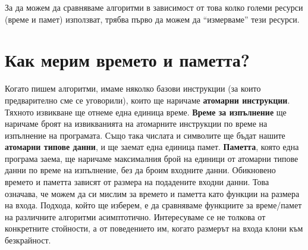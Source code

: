 \documentclass{article}
\theoremstyle{definition}
\theoremstyle{plain}
\theoremstyle{remark}
\theoremstyle{definition}
\begin{document}
За да можем да сравняваме алгоритми в зависимост от това колко големи ресурси (време и памет) използват, трябва първо да можем да ``измерваме'' тези ресурси.

\section*{Как мерим времето и паметта?}

Когато пишем алгоритми, имаме няколко базови инструкции (за които предварително сме се уговорили), които ще наричаме \textbf{атомарни инструкции}.
Тяхното извикване ще отнеме една единица време.
\textbf{Време за изпълнение} ще наричаме броят на извикванията на атомарните инструкции по време на изпълнение на програмата.
Също така числата и символите ще бъдат нашите \textbf{атомарни типове данни}, и ще заемат една единица памет.
\textbf{Паметта}, която една програма заема, ще наричаме максималния брой на единици от атомарни типове данни по време на изпълнение, без да броим входните данни.
Обикновено времето и паметта зависят от размера на подадените входни данни.
Това означава, че можем да си мислим за времето и паметта като функции на размера на входа.
Подхода, който ще изберем, е да сравняваме функциите за време/памет на различните алгоритми асимптотично.
Интересуваме се не толкова от конкретните стойности, а от поведението им, когато размерът на входа клони към безкрайност.
\end{document}
